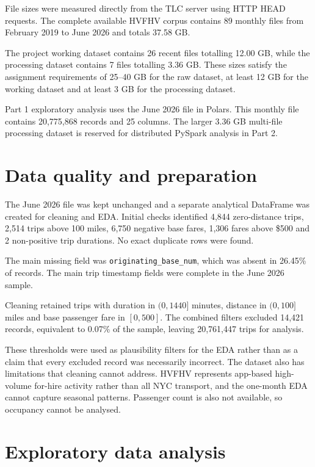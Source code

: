 \documentclass[10pt,twocolumn]{article}
\begin{document}
File sizes were measured directly from the TLC server using HTTP HEAD
requests. The complete available HVFHV corpus contains 89 monthly files
from February 2019 to June 2026 and totals 37.58 GB.

The project working dataset contains 26 recent files totalling 12.00 GB,
while the processing dataset contains 7 files totalling 3.36 GB. These
sizes satisfy the assignment requirements of 25--40 GB for the raw
dataset, at least 12 GB for the working dataset and at least 3 GB for
the processing dataset.

Part 1 exploratory analysis uses the June 2026 file in Polars. This
monthly file contains 20,775,868 records and 25 columns. The larger
3.36 GB multi-file processing dataset is reserved for distributed
PySpark analysis in Part 2.


\section{Data quality and preparation}

The June 2026 file was kept unchanged and a separate analytical
DataFrame was created for cleaning and EDA. Initial checks identified
4,844 zero-distance trips, 2,514 trips above 100 miles, 6,750 negative
base fares, 1,306 fares above \$500 and 2 non-positive trip durations.
No exact duplicate rows were found.

The main missing field was \texttt{originating\_base\_num}, which was
absent in 26.45\% of records. The main trip timestamp fields were
complete in the June 2026 sample.

Cleaning retained trips with duration in $(0,1440]$ minutes, distance
in $(0,100]$ miles and base passenger fare in $[0,500]$. The combined
filters excluded 14,421 records, equivalent to 0.07\% of the sample,
leaving 20,761,447 trips for analysis.

These thresholds were used as plausibility filters for the EDA rather
than as a claim that every excluded record was necessarily incorrect.
The dataset also has limitations that cleaning cannot address. HVFHV
represents app-based high-volume for-hire activity rather than all NYC
transport, and the one-month EDA cannot capture seasonal patterns.
Passenger count is also not available, so occupancy cannot be analysed.


\section{Exploratory data analysis}
\end{document}
